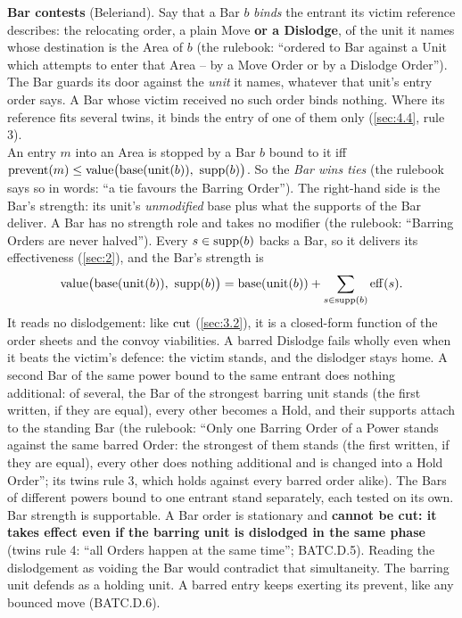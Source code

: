 \documentclass[12pt,a4paper]{article}
\begin{document}
\textbf{Bar contests} (Beleriand).
Say that a Bar $b$ \emph{binds} the entrant its victim reference describes: the relocating order, a plain Move \textbf{or a Dislodge}, of the unit it names whose destination is the Area of $b$ (the rulebook: ``ordered to Bar against a Unit which attempts to enter that Area -- by a Move Order or by a Dislodge Order'').
The Bar guards its door against the \emph{unit} it names, whatever that unit's entry order says.
A Bar whose victim received no such order binds nothing.
Where its reference fits several twins, it binds the entry of one of them only (\cref{sec:4.4}, rule 3).\\
An entry $m$ into an Area is stopped by a Bar $b$ bound to it iff $\operatorname{prevent}(m) \le \operatorname{value}\bigl(\operatorname{base}(\operatorname{unit}(b)),\ \operatorname{supp}(b)\bigr)$.
So the \emph{Bar wins ties} (the rulebook says so in words: ``a tie favours the Barring Order'').
The right-hand side is the Bar's strength: its unit's \emph{unmodified} base plus what the supports of the Bar deliver.
A Bar has no strength role and takes no modifier (the rulebook: ``Barring Orders are never halved'').
Every $s \in \operatorname{supp}(b)$ backs a Bar, so it delivers its effectiveness (\cref{sec:2}), and the Bar's strength is
\[
\operatorname{value}\bigl(\operatorname{base}(\operatorname{unit}(b)),\ \operatorname{supp}(b)\bigr) = \operatorname{base}(\operatorname{unit}(b)) + \sum_{s \in \operatorname{supp}(b)} \operatorname{eff}(s).
\]
It reads no dislodgement: like $\operatorname{cut}$ (\cref{sec:3.2}), it is a closed-form function of the order sheets and the convoy viabilities.
A barred Dislodge fails wholly even when it beats the victim's defence: the victim stands, and the dislodger stays home.
A second Bar of the same power bound to the same entrant does nothing additional: of several, the Bar of the strongest barring unit stands (the first written, if they are equal), every other becomes a Hold, and their supports attach to the standing Bar (the rulebook: ``Only one Barring Order of a Power stands against the same barred Order: the strongest of them stands (the first written, if they are equal), every other does nothing additional and is changed into a Hold Order''; its twins rule 3, which holds against every barred order alike).
The Bars of different powers bound to one entrant stand separately, each tested on its own.
Bar strength is supportable.
A Bar order is stationary and \textbf{cannot be cut: it takes effect even if the barring unit is dislodged in the same phase} (twins rule 4: ``all Orders happen at the same time''; BATC.D.5).
Reading the dislodgement as voiding the Bar would contradict that simultaneity.
The barring unit defends as a holding unit.
A barred entry keeps exerting its prevent, like any bounced move (BATC.D.6).
\end{document}
